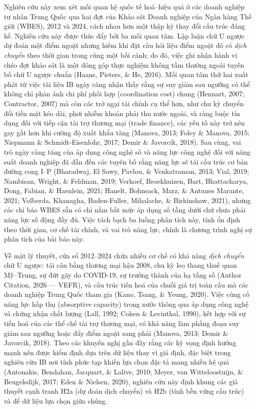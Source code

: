 \documentclass[12pt,a4paper]{article}
\begin{document}
Nghiên cứu này xem xét mối quan hệ quốc tế hoá--hiệu quả ở các doanh
nghiệp tư nhân Trung Quốc qua hai đợt của Khảo sát Doanh nghiệp của Ngân
hàng Thế giới (WBES), 2012 và 2024, cách nhau hơn một thập kỷ thay đổi
cấu trúc đáng kể. Nghiên cứu này được thúc đẩy bởi ba mối quan tâm. Lập
luận chữ U ngược dự đoán một điểm ngoặt nhưng hiếm khi đặt câu hỏi liệu
điểm ngoặt đó có \emph{dịch chuyển} theo thời gian trong cùng một bối
cảnh; do đó, việc ghi nhận hành vi chéo đợt khảo sát là một đóng góp
thực nghiệm không tầm thường ngoài tuyên bố chữ U ngược chuẩn (Haans,
Pieters, \& He, 2016). Mối quan tâm thứ hai xuất phát từ việc tài liệu
IB ngày càng nhận thấy rằng sự suy giảm sau ngưỡng có thể không chỉ phản
ánh chi phí phối hợp (coordination cost) chung (Hennart, 2007;
Contractor, 2007) mà còn các trở ngại tài chính cụ thể hơn, như chu kỳ
chuyển đổi tiền mặt kéo dài, phơi nhiễm khoản phải thu nước ngoài, và
ràng buộc tín dụng đối với tiếp cận tài trợ thương mại (trade finance),
các yếu tố này trở nên gay gắt hơn khi cường độ xuất khẩu tăng (Manova,
2013; Foley \& Manova, 2015; Niepmann \& Schmidt-Eisenlohr, 2017; Demir
\& Javorcik, 2018). Sau cùng, vai trò ngày càng tăng của áp dụng công
nghệ số và năng lực công nghệ đối với năng suất doanh nghiệp đã dẫn đến
các tuyên bố rằng năng lực sẽ tái cấu trúc cơ bản đường cong I--P
(Bharadwaj, El Sawy, Pavlou, \& Venkatraman, 2013; Vial, 2019; Nambisan,
Wright, \& Feldman, 2019; Verhoef, Broekhuizen, Bart, Bhattacharya,
Dong, Fabian, \& Haenlein, 2021; Hanelt, Bohnsack, Marz, \& Antunes
Marante, 2021; Volberda, Khanagha, Baden-Fuller, Mihalache, \&
Birkinshaw, 2021), nhưng các chỉ báo WBES sẵn có chỉ nắm bắt mức áp dụng
số tầng dưới chứ chưa phải năng lực số động đầy đủ. Việc tách bạch ba
luồng phân tích này, tính ổn định theo thời gian, cơ chế tài chính, và
vai trò năng lực, chính là chương trình nghị sự phân tích của bài báo
này.

Về mặt lý thuyết, cửa sổ 2012--2024 chứa nhiều cơ chế có khả năng
\emph{dịch chuyển} chữ U ngược: tái cân bằng thương mại hậu 2008, chu kỳ
leo thang thuế quan Mỹ--Trung, sự đứt gãy do COVID-19, sự trưởng thành
của hạ tầng số (Author Citation, 2026 --- VEFR), và cấu trúc tiến hoá
của chuỗi giá trị toàn cầu mà các doanh nghiệp Trung Quốc tham gia
(Kano, Tsang, \& Yeung, 2020). Việc củng cố năng lực hấp thụ (absorptive
capacity) trong nước thông qua áp dụng công nghệ và chứng nhận chất
lượng (Lall, 1992; Cohen \& Levinthal, 1990), kết hợp với sự tiến hoá
của các thể chế tài trợ thương mại, có khả năng làm phẳng đoạn suy giảm
sau ngưỡng hoặc đẩy điểm ngoặt sang phải (Manova, 2013; Demir \&
Javorcik, 2018). Theo các khuyến nghị gần đây rằng các kỳ vọng định
hướng mạnh nên được kiểm định dựa trên dữ liệu thay vì giả định, đặc
biệt trong nghiên cứu IB nơi tính phức tạp khiến lựa chọn đặc tả mang
nhiều hệ quả (Antonakis, Bendahan, Jacquart, \& Lalive, 2010; Meyer, van
Witteloostuijn, \& Beugelsdijk, 2017; Eden \& Nielsen, 2020), nghiên cứu
này định khung các giả thuyết cạnh tranh H2a (dự đoán dịch chuyển) và
H2b (tính bền vững cấu trúc) và để dữ liệu lựa chọn giữa chúng.
\end{document}
